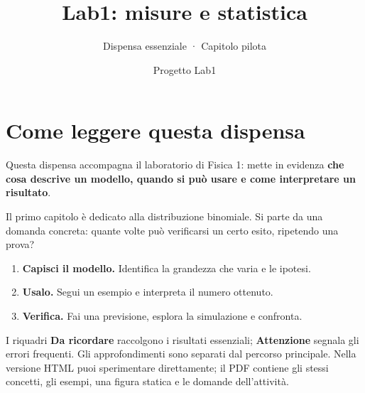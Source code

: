 \documentclass[
  italian,
  letterpaper,
  DIV=11,
  numbers=noendperiod]{scrreprt}
\title{Lab1: misure e statistica}
\subtitle{Dispensa essenziale · Capitolo pilota}
\author{Progetto Lab1}
\date{}
\providecommand{\tightlist}{%
  \setlength{\itemsep}{0pt}\setlength{\parskip}{0pt}}
\renewcommand*\contentsname{Indice}
\newcommand\contentsname{Indice}
\begin{document}
\maketitle

\renewcommand*\contentsname{Indice}
{
\setcounter{tocdepth}{2}
\tableofcontents
}


\chapter*{Come leggere questa
dispensa}\label{come-leggere-questa-dispensa}


Questa dispensa accompagna il laboratorio di Fisica 1: mette in evidenza
\textbf{che cosa descrive un modello, quando si può usare e come
interpretare un risultato}.

Il primo capitolo è dedicato alla distribuzione binomiale. Si parte da
una domanda concreta: quante volte può verificarsi un certo esito,
ripetendo una prova?

\begin{tcolorbox}[enhanced jigsaw, arc=.35mm, bottomrule=.15mm, bottomtitle=1mm, breakable, colback=white, colbacktitle=quarto-callout-note-color!10!white, colframe=quarto-callout-note-color-frame, coltitle=black, left=2mm, leftrule=.75mm, opacityback=0, opacitybacktitle=0.6, rightrule=.15mm, title={Un percorso in tre passi}, titlerule=0mm, toprule=.15mm, toptitle=1mm]

\begin{enumerate}
\def\labelenumi{\arabic{enumi}.}
\tightlist
\item
  \textbf{Capisci il modello.} Identifica la grandezza che varia e le
  ipotesi.
\item
  \textbf{Usalo.} Segui un esempio e interpreta il numero ottenuto.
\item
  \textbf{Verifica.} Fai una previsione, esplora la simulazione e
  confronta.
\end{enumerate}

\end{tcolorbox}

I riquadri \textbf{Da ricordare} raccolgono i risultati essenziali;
\textbf{Attenzione} segnala gli errori frequenti. Gli approfondimenti
sono separati dal percorso principale. Nella versione HTML puoi
sperimentare direttamente; il PDF contiene gli stessi concetti, gli
esempi, una figura statica e le domande dell'attività.
\end{document}
